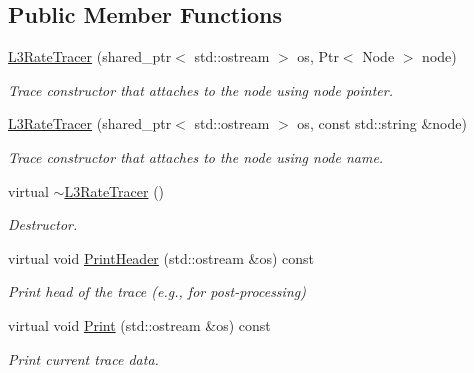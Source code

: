 \subsection*{Public Member Functions}
\begin{DoxyCompactItemize}
\item 
\hyperlink{classns3_1_1ndn_1_1L3RateTracer_a15512a675574e65f91e339e158b226fa}{L3\+Rate\+Tracer} (shared\+\_\+ptr$<$ std\+::ostream $>$ os, Ptr$<$ Node $>$ node)
\begin{DoxyCompactList}\small\item\em Trace constructor that attaches to the node using node pointer. \end{DoxyCompactList}\item 
\hyperlink{classns3_1_1ndn_1_1L3RateTracer_aafa9b98bf7a999496276d0628340640b}{L3\+Rate\+Tracer} (shared\+\_\+ptr$<$ std\+::ostream $>$ os, const std\+::string \&node)
\begin{DoxyCompactList}\small\item\em Trace constructor that attaches to the node using node name. \end{DoxyCompactList}\item 
virtual \hyperlink{classns3_1_1ndn_1_1L3RateTracer_afa96c8d2b0d282dc3b6b4b43bae23b8f}{$\sim$\+L3\+Rate\+Tracer} ()\hypertarget{classns3_1_1ndn_1_1L3RateTracer_afa96c8d2b0d282dc3b6b4b43bae23b8f}{}\label{classns3_1_1ndn_1_1L3RateTracer_afa96c8d2b0d282dc3b6b4b43bae23b8f}

\begin{DoxyCompactList}\small\item\em Destructor. \end{DoxyCompactList}\item 
virtual void \hyperlink{classns3_1_1ndn_1_1L3RateTracer_ae22420a70f3a31d917dc8101dbed8434}{Print\+Header} (std\+::ostream \&os) const
\begin{DoxyCompactList}\small\item\em Print head of the trace (e.\+g., for post-\/processing) \end{DoxyCompactList}\item 
virtual void \hyperlink{classns3_1_1ndn_1_1L3RateTracer_afd92b9548281a6bf35231cf36d82d106}{Print} (std\+::ostream \&os) const
\begin{DoxyCompactList}\small\item\em Print current trace data. \end{DoxyCompactList}\end{DoxyCompactItemize}
